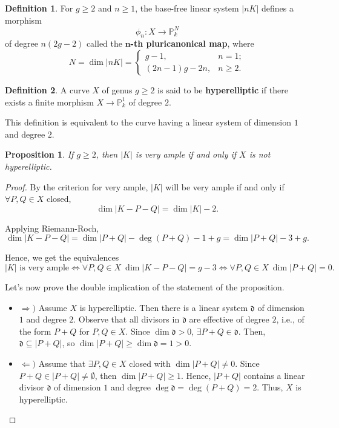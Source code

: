 \documentclass[12pt]{article}
\newtheorem*{proposition}{Proposition}
\theoremstyle{definition}
\newtheorem*{definition}{Definition}
\begin{document}
\begin{definition}
For $g\geq2$ and $n\geq1$, the base-free linear system $|nK|$ defines a morphism
\[\phi_n:X\longrightarrow\mathbb{P}_k^N\]
of degree $n(2g-2)$ called the $\boldsymbol{n}$\textbf{-th pluricanonical map}, where
\[N=\dim|nK|=\left\{\begin{array}{ll}g-1,&n=1;\\(2n-1)g-2n,&n\geq2.\end{array}\right.\]
\end{definition}

\begin{definition}
A curve $X$ of genus $g\geq2$ is said to be \textbf{hyperelliptic} if there exists a finite morphism $X\rightarrow\mathbb{P}_k^1$ of degree $2$.
\end{definition}

This definition is equivalent to the curve having a linear system of dimension $1$ and degree $2$.

\begin{proposition}
If $g\geq2$, then $|K|$ is very ample if and only if $X$ is not hyperelliptic.
\end{proposition}

\begin{proof}
By the criterion for very ample, $|K|$ will be very ample if and only if $\forall P,Q\in X$ closed,
\[\dim|K-P-Q|=\dim|K|-2.\]

Applying Riemann-Roch,
\[\dim|K-P-Q|=\dim|P+Q|-\deg(P+Q)-1+g=\dim|P+Q|-3+g.\]

Hence, we get the equivalences
\[|K|\text{ is very ample}\Longleftrightarrow\forall P,Q\in X\ \dim|K-P-Q|=g-3\Longleftrightarrow\forall P,Q\in X\ \dim|P+Q|=0.\]

Let's now prove the double implication of the statement of the proposition.

\begin{itemize}
\item $\Rightarrow)$ Assume $X$ is hyperelliptic. Then there is a linear system $\mathfrak{d}$ of dimension $1$ and degree $2$. Observe that all divisors in $\mathfrak{d}$ are effective of degree $2$, i.e., of the form $P+Q$ for $P,Q\in X$. Since $\dim\mathfrak{d}>0$, $\exists P+Q\in\mathfrak{d}$. Then, $\mathfrak{d}\subseteq|P+Q|$, so $\dim|P+Q|\geq\dim\mathfrak{d}=1>0$.

\item $\Leftarrow)$ Assume that $\exists P,Q\in X$ closed with $\dim|P+Q|\neq0$. Since $P+Q\in|P+Q|\neq\emptyset$, then $\dim|P+Q|\geq1$. Hence, $|P+Q|$ contains a linear divisor $\mathfrak{d}$ of dimension $1$ and degree $\deg\mathfrak{d}=\deg(P+Q)=2$. Thus, $X$ is hyperelliptic.
\end{itemize}
\end{proof}
\end{document}
